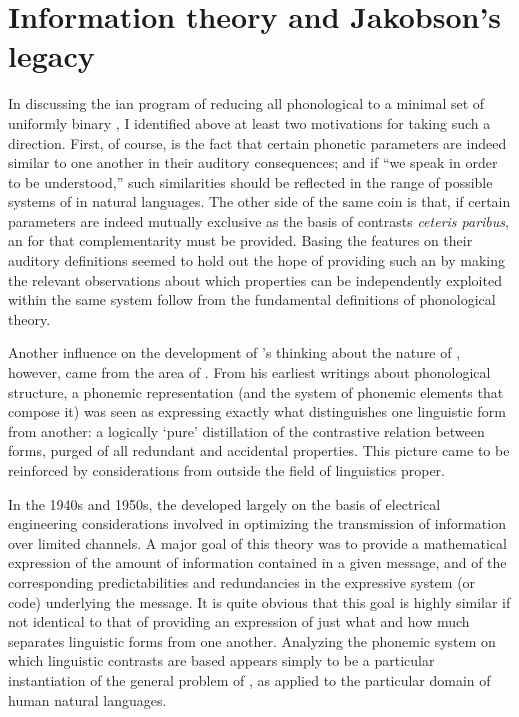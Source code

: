 \section{Information theory and Jakobson's legacy}

In discussing the {\Jakobson}ian program of reducing all phonological
 to a minimal set of uniformly binary , I
identified above at least two motivations for taking such a
direction. First, of course, is the fact that certain phonetic
parameters are indeed similar to one another in their auditory
consequences; and if ``we speak in order to be understood,'' such
similarities should be reflected in the range of possible systems of
 in natural languages. The other side of the same coin is
that, if certain parameters are indeed mutually exclusive as the basis
of contrasts \emph{ceteris paribus}, an  for that
complementarity must be provided. Basing the features on their
auditory definitions seemed to hold out the hope of providing such an
 by making the relevant observations about which properties
can be independently exploited within the same system follow from the
fundamental definitions of phonological theory.

Another influence on the development of {\Jakobson}'s thinking about the
nature of , however, came from the area of
. From his earliest writings about phonological
structure, a phonemic representation (and the system of phonemic
elements that compose it) was seen as expressing exactly what
distinguishes one linguistic form from another: a logically `pure'
distillation of the contrastive relation between forms, purged of all
redundant and accidental properties. This picture came to be
reinforced by considerations from outside the field of linguistics
proper.

In the 1940s and 1950s, the 
developed largely on the basis of electrical engineering
considerations involved in optimizing the transmission of information
over limited channels. A major goal of this theory was to provide a
mathematical expression of the amount of information contained in a
given message, and of the corresponding predictabilities and
redundancies in the expressive system (or code) underlying the
message. It is quite obvious that this goal is highly similar if not
identical to that of providing an expression of just what and how much
separates linguistic forms from one another. Analyzing the phonemic
system on which linguistic contrasts are based appears simply to be a
particular instantiation of the general problem of ,
as applied to the particular domain of human natural languages.

